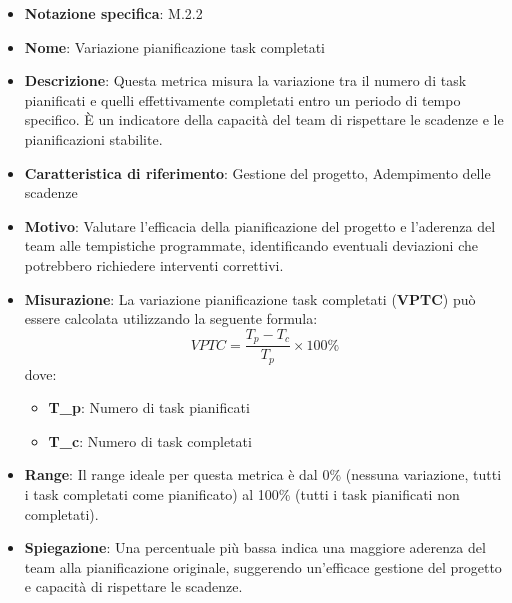 \begin{itemize}
    \item \textbf{Notazione specifica}: M.2.2
    \item \textbf{Nome}: Variazione pianificazione task completati
    \item \textbf{Descrizione}: Questa metrica misura la variazione tra il numero di task pianificati e quelli effettivamente completati entro un periodo di tempo specifico. È un indicatore della capacità del team di rispettare le scadenze e le pianificazioni stabilite.
    \item \textbf{Caratteristica di riferimento}: Gestione del progetto, Adempimento delle scadenze
    \item \textbf{Motivo}: Valutare l'efficacia della pianificazione del progetto e l'aderenza del team alle tempistiche programmate, identificando eventuali deviazioni che potrebbero richiedere interventi correttivi.
    \item \textbf{Misurazione}: La variazione pianificazione task completati (\textbf{VPTC}) può essere calcolata utilizzando la seguente formula:
    \[ VPTC = \frac{T_p - T_c}{T_p} \times 100\% \]
    dove:
    \begin{itemize}
        \item \textbf{T_p}: Numero di task pianificati
        \item \textbf{T_c}: Numero di task completati
    \end{itemize}
    \item \textbf{Range}: Il range ideale per questa metrica è dal 0\% (nessuna variazione, tutti i task completati come pianificato) al 100\% (tutti i task pianificati non completati).
    \item \textbf{Spiegazione}: Una percentuale più bassa indica una maggiore aderenza del team alla pianificazione originale, suggerendo un'efficace gestione del progetto e capacità di rispettare le scadenze.
\end{itemize}
